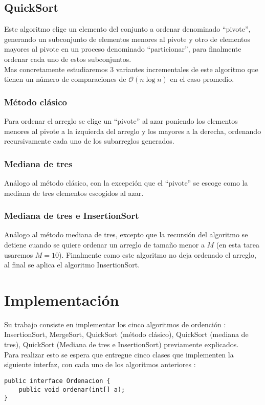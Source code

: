 \documentclass[dcc]{fcfmcourse}
\begin{document}
\subsection*{QuickSort}
Este algoritmo elige un elemento del conjunto a ordenar denominado ``pivote'', generando un subconjunto de elementos menores al pivote y otro de elementos mayores al pivote en un proceso denominado ``particionar'', para finalmente ordenar cada uno de estos subconjuntos.\\
Mas concretamente estudiaremos 3 variantes incrementales de este algoritmo que tienen un número de comparaciones de $\mathcal{O}(n \log n)$ en el caso promedio.
\subsubsection*{Método clásico}
Para ordenar el arreglo se elige un ``pivote'' al azar poniendo los elementos menores al pivote a la izquierda del arreglo y los mayores a la derecha, ordenando recursivamente cada uno de los subarreglos generados.
\subsubsection*{Mediana de tres}
Análogo al método clásico, con la excepción que el ``pivote'' se escoge como la mediana de tres elementos escogidos al azar.
\subsubsection*{Mediana de tres e InsertionSort}
Análogo al método mediana de tres, excepto que la recursión del algoritmo se detiene cuando se quiere ordenar un arreglo de tamaño menor a $M$ (en esta tarea usaremos $M=10$). Finalmente como este algoritmo no deja ordenado el arreglo, al final se aplica el algoritmo InsertionSort.

\section{Implementación}
Su trabajo consiste en implementar los cinco algoritmos de ordención : InsertionSort, MergeSort, QuickSort (método clásico), QuickSort (mediana de tres), QuickSort (Mediana de tres e InsertionSort) previamente explicados.\\

Para realizar esto se espera que entregue cinco clases que implementen la siguiente interfaz, con cada uno de los algoritmos anteriores :
\begin{center}
\begin{lstlisting}
public interface Ordenacion {
 	public void ordenar(int[] a);
}
\end{lstlisting}
\end{center}
\end{document}
